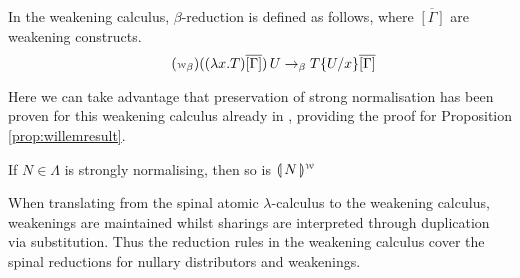 \documentclass[a4paper,UKenglish,cleveref, autoref]{lipics-v2019}
\newcommand{\abs}[2]{\lambda #1 . #2}
\newcommand{\app}[2]{#1 \, #2}
\newcommand{\sub}[3]{#1 \{ #2 / #3 \}}
\newcommand{\weaksymbol}{\mbox{\tiny $\mathcal{W}$}}
\newcommand{\compweak}[1]{\llparenthesis \, #1 \, \rrparenthesis^{\weaksymbol}}
\begin{document}
\begin{definition}
In the weakening calculus, $\beta$-reduction is defined as follows, where $\overline{[\Gamma]}$ are weakening constructs.
\begin{equation}
\tag{$\weaksymbol_{\beta}$}
	\app{((\abs{x}{T}) \overline{[\Gamma]})}{U} \rightarrow_{\beta} \sub{T}{U}{x} \overline{[\Gamma]} \\
\end{equation}
\end{definition}

\noindent Here we can take advantage that preservation of strong normalisation has been proven for this weakening calculus already in \cite{gundersen2013atomic}, providing the proof for Proposition \ref{prop:willemresult}. 

\begin{proposition}
\label{prop:willemresult}
 If $N \in \Lambda$ is strongly normalising, then so is $\compweak{N}$
\end{proposition}

When translating from the spinal atomic $\lambda$-calculus to the weakening calculus, weakenings are maintained whilst sharings are interpreted through duplication via substitution. Thus the reduction rules in the weakening calculus cover the spinal reductions for nullary distributors and weakenings.
\end{document}
